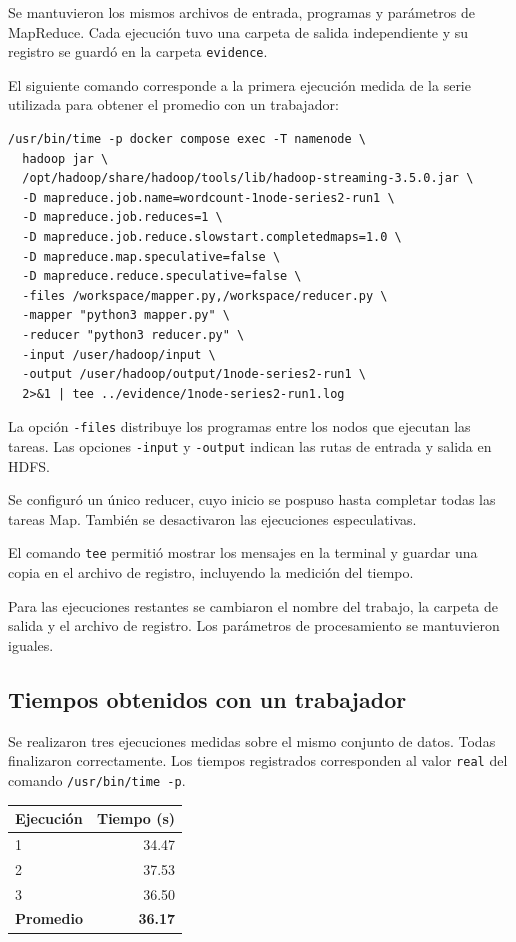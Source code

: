 Se mantuvieron los mismos archivos de entrada,
programas y parámetros de MapReduce. Cada ejecución
tuvo una carpeta de salida independiente y su registro
se guardó en la carpeta \texttt{evidence}.

El siguiente comando corresponde a la primera ejecución
medida de la serie utilizada para obtener el promedio
con un trabajador:

\begin{lstlisting}[language={}]
/usr/bin/time -p docker compose exec -T namenode \
  hadoop jar \
  /opt/hadoop/share/hadoop/tools/lib/hadoop-streaming-3.5.0.jar \
  -D mapreduce.job.name=wordcount-1node-series2-run1 \
  -D mapreduce.job.reduces=1 \
  -D mapreduce.job.reduce.slowstart.completedmaps=1.0 \
  -D mapreduce.map.speculative=false \
  -D mapreduce.reduce.speculative=false \
  -files /workspace/mapper.py,/workspace/reducer.py \
  -mapper "python3 mapper.py" \
  -reducer "python3 reducer.py" \
  -input /user/hadoop/input \
  -output /user/hadoop/output/1node-series2-run1 \
  2>&1 | tee ../evidence/1node-series2-run1.log
\end{lstlisting}

La opción \texttt{-files} distribuye los programas
entre los nodos que ejecutan las tareas. Las opciones
\texttt{-input} y \texttt{-output} indican las rutas
de entrada y salida en HDFS.

Se configuró un único reducer, cuyo inicio se pospuso
hasta completar todas las tareas Map. También se
desactivaron las ejecuciones especulativas.

El comando \texttt{tee} permitió mostrar los mensajes
en la terminal y guardar una copia en el archivo de
registro, incluyendo la medición del tiempo.

Para las ejecuciones restantes se cambiaron el nombre
del trabajo, la carpeta de salida y el archivo de
registro. Los parámetros de procesamiento se
mantuvieron iguales.

\subsection{Tiempos obtenidos con un trabajador}

Se realizaron tres ejecuciones medidas sobre el mismo 
conjunto de datos. Todas finalizaron correctamente. 
Los tiempos registrados corresponden al valor 
\texttt{real} del comando \texttt{/usr/bin/time -p}.


\begin{center}
    \begin{tabular}{lr}
        \toprule
        \textbf{Ejecución} & \textbf{Tiempo (s)} \\
        \midrule
        1 & 34.47 \\
        2 & 37.53 \\
        3 & 36.50 \\
        \midrule
        \textbf{Promedio} & \textbf{36.17} \\
        \bottomrule
    \end{tabular}
\end{center}

